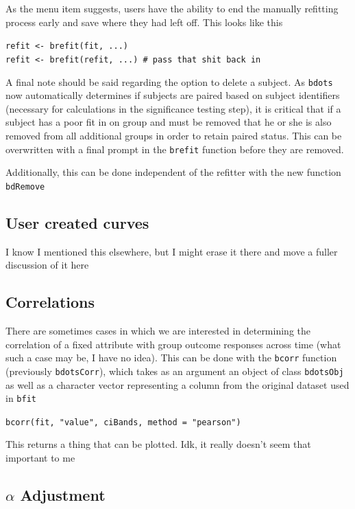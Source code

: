 \documentclass{article}
\begin{document}
As the menu item suggests, users have the ability to end the manually refitting process early and save where they had left off. This looks like this

\begin{center}
\texttt{refit <- brefit(fit, ...)} \\
\texttt{refit <- brefit(refit, ...) \# pass that shit back in}
\end{center}

A final note should be said regarding the option to delete a subject. As \texttt{bdots} now automatically determines if subjects are paired based on subject identifiers (necessary for  calculations in the significance testing step), it is critical that if a subject has a poor fit in on group and must be removed that he or she is also removed from all additional groups in order to retain paired status. This can be overwritten with a final prompt in the \texttt{brefit} function before they are removed.

Additionally, this can be done independent of the refitter with the new function \texttt{bdRemove}


\subsection{User created curves}

I know I mentioned this elsewhere, but I might erase it there and move a fuller discussion of it here

\subsection{Correlations}

There are sometimes cases in which we are interested in determining the correlation of a fixed attribute with group outcome responses across time (what such a case may be, I have no idea). This can be done with the \texttt{bcorr} function (previously \texttt{bdotsCorr}), which takes as an argument an object of class \texttt{bdotsObj} as well as a character vector representing a column from the original dataset used in \texttt{bfit}

\begin{center}
\texttt{bcorr(fit, "value", ciBands, method = "pearson")} 
\end{center}

This returns a thing that can be plotted. Idk, it really doesn't seem that important to me

\subsection{$\alpha$ Adjustment}
\end{document}
